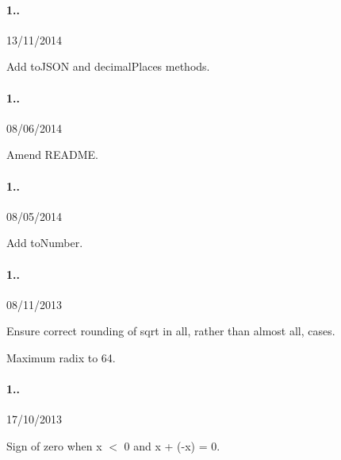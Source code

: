 \paragraph*{1..}


\begin{DoxyItemize}
\item 13/11/2014
\item Add {\ttfamily to\+J\+S\+O\+N} and {\ttfamily decimal\+Places} methods.
\end{DoxyItemize}

\paragraph*{1..}


\begin{DoxyItemize}
\item 08/06/2014
\item Amend R\+E\+A\+D\+M\+E.
\end{DoxyItemize}

\paragraph*{1..}


\begin{DoxyItemize}
\item 08/05/2014
\item Add {\ttfamily to\+Number}.
\end{DoxyItemize}

\paragraph*{1..}


\begin{DoxyItemize}
\item 08/11/2013
\item Ensure correct rounding of {\ttfamily sqrt} in all, rather than almost all, cases.
\item Maximum radix to 64.
\end{DoxyItemize}

\paragraph*{1..}


\begin{DoxyItemize}
\item 17/10/2013
\item Sign of zero when x $<$ 0 and x + (-\/x) = 0.
\end{DoxyItemize}

